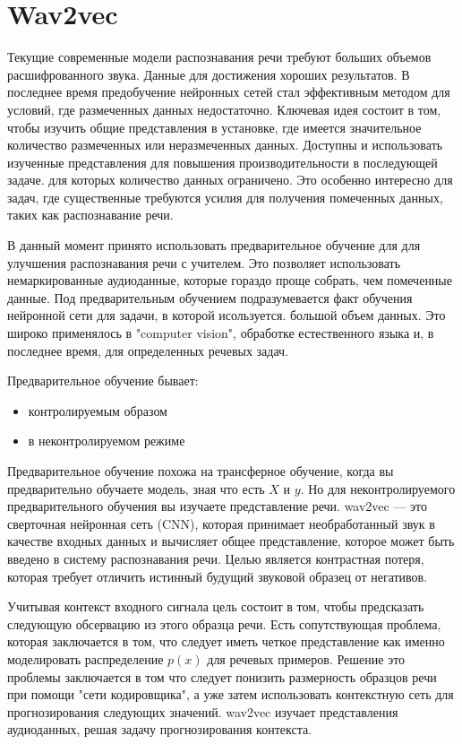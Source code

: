 \section{Wav2vec}
Текущие современные модели распознавания речи требуют больших объемов расшифрованного звука.
Данные для достижения хороших результатов. В последнее время предобучение нейронных сетей
стал эффективным методом для условий, где размеченных данных недостаточно. Ключевая идея состоит в том, чтобы
изучить общие представления в установке, где имеется значительное количество размеченных или неразмеченных данных.
Доступны и использовать изученные представления для повышения производительности в последующей задаче.
для которых количество данных ограничено. Это особенно интересно для задач, где существенные
требуются усилия для получения помеченных данных, таких как распознавание речи.

В данный момент принято использовать предварительное обучение для для улучшения распознавания речи с учителем. Это
позволяет использовать немаркированные аудиоданные, которые гораздо проще собрать, чем помеченные данные.
Под предварительным обучением подразумевается факт обучения нейронной сети для задачи, в которой исользуется.
большой объем данных. 
Это широко применялось в "computer vision", обработке естественного языка и, в последнее время, для определенных речевых задач.

Предварительное обучение бывает: 

\begin{itemize}
  \item контролируемым образом
  \item в неконтролируемом режиме
\end{itemize}

Предварительное обучение похожа на трансферное обучение, когда вы предварительно обучаете модель, зная что есть $X$ и $y$.
Но для неконтролируемого предварительного обучения вы изучаете представление речи. 
wav2vec — это сверточная нейронная сеть (CNN), которая принимает необработанный звук 
в качестве входных данных и вычисляет общее представление, 
которое может быть введено в систему распознавания речи. 
Целью является контрастная потеря, которая требует отличить истинный будущий звуковой образец от негативов.

Учитывая контекст входного сигнала цель состоит в том, чтобы предсказать следующую обсервацию из этого образца речи.
Есть сопутствующая проблема, которая заключается в том, что следует иметь четкое представление как именно 
моделировать распределение $p(x)$ для речевых примеров. Решение это проблемы заключается в том что 
следует понизить размерность образцов речи при помощи "сети кодировщика", а уже затем использовать
контекстную сеть для прогнозирования следующих значений. 
wav2vec изучает представления аудиоданных, решая задачу прогнозирования контекста.

